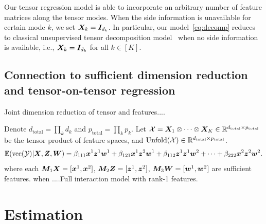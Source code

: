 \documentclass[12pt]{article}
\theoremstyle{plain}
\theoremstyle{definition}
\begin{document}
Our tensor regression model is able to incorporate an arbitrary number of feature matrices along the tensor modes. When the side information is unavailable for certain mode $k$, we set $\bm X_k=\bm I_{d_k}$. In particular, our model~\eqref{eq:decomp} reduces to classical unsupervised tensor decomposition model~\citep{de2000multilinear,hong2018generalized} when no side information is available, i.e., $\bm X_k=\bm I_{d_k}$ for all $k\in[K]$.

\subsection{Connection to sufficient dimension reduction and tensor-on-tensor regression}
Joint dimension reduction of tensor and features....

Denote $d_{\text{total}}=\prod_k d_k$ and $p_{\text{total}}=\prod_k p_k$. Let $\mathcal{X}=\bm X_1\otimes \cdots \otimes \bm X_K \in \mathbb{R}^{d_{\text{total}} \times p_{\text{total}}}$ be the tensor product of feature spaces, and $\text{Unfold}(\mathcal{X}) \in\mathbb{R}^{d_{\text{total}}\times p_{\text{total}}}$.
\[
\mathbb{E}(\text{vec}(\mathcal{Y})|\bm X,\bm Z,\bm{W}) =\beta_{111}\bm x^1\bm{z}^1\bm{w}^1+\beta_{121}\bm x^1\bm{z}^2\bm{w}^1+\beta_{112}\bm{z}^1\bm{z}^1\bm{w}^2+\cdots+\beta_{222}\bm x^2\bm{z}^2\bm{w}^2.
\]
where each $\bm M_1\bm X=[\bm x^1,\bm x^2]$, $\bm M_2\bm Z=[\bm{z}^1,\bm{z}^2]$, $\bm M_3\bm{W}=[\bm{w}^1,\bm{w}^2]$ are sufficient features. when ....Full interaction model with rank-1 features. 

\section{Estimation}\label{sec:est}
\end{document}
